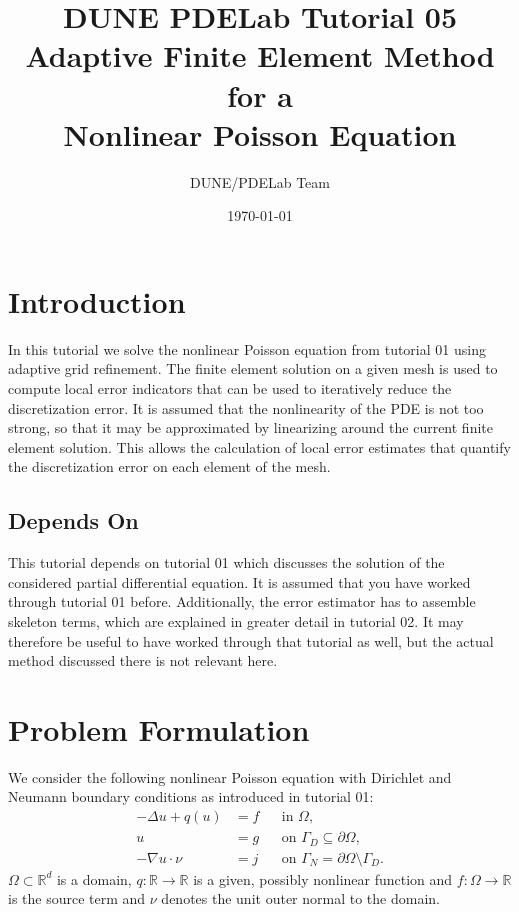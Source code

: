 \documentclass[a4paper,12pt]{article}
\title{DUNE PDELab Tutorial 05 \\
Adaptive Finite Element Method for a\\
Nonlinear Poisson Equation}
\author{DUNE/PDELab Team}
\date{\today}
\begin{document}
\maketitle
\tableofcontents
\clearpage

\section{Introduction}

In this tutorial we solve the nonlinear Poisson equation from tutorial 01 using
adaptive grid refinement. The finite element solution on a given mesh is used to
compute local error indicators that can be used to iteratively reduce the
discretization error. It is assumed that the nonlinearity of the PDE is not too
strong, so that it may be approximated by linearizing around the current finite
element solution. This allows the calculation of local error estimates
that quantify the discretization error on each element of the mesh.

\subsection*{Depends On} This tutorial depends on tutorial 01 which discusses
the solution of the considered partial differential equation. It is assumed that
you have worked through tutorial 01 before. Additionally, the error estimator has
to assemble skeleton terms, which are explained in greater detail in tutorial 02.
It may therefore be useful to have worked through that tutorial as well, but the
actual method discussed there is not relevant here.

\section{Problem Formulation}

We consider the following nonlinear Poisson equation with
Dirichlet and Neumann boundary conditions as introduced in tutorial 01:
\begin{subequations} \label{eq:ProblemStrong}
\begin{align}
-\Delta u + q(u) &= f &&\text{in $\Omega$},\\
u &= g &&\text{on $\Gamma_D\subseteq\partial\Omega$},\\
-\nabla u\cdot \nu &= j &&\text{on $\Gamma_N=\partial\Omega\setminus\Gamma_D$}.
\end{align}
\end{subequations}
$\Omega\subset\mathbb{R}^d$ is a domain, $q:\mathbb{R}\to\mathbb{R}$ is a given, possibly
nonlinear function and $f: \Omega\to\mathbb{R}$ is the source term and
$\nu$ denotes the unit outer normal to the domain.
\end{document}
